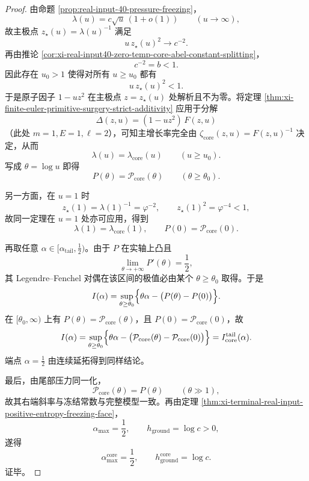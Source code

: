 \begin{proof}
由命题 \ref{prop:real-input-40-pressure-freezing}，
\[
\lambda(u)=c\sqrt u\,(1+o(1))
\qquad(u\to\infty),
\]
故主极点 \(z_\star(u)=\lambda(u)^{-1}\) 满足
\[
u\,z_\star(u)^2\longrightarrow c^{-2}.
\]
再由推论 \ref{cor:xi-real-input40-zero-temp-core-abel-constant-splitting}，
\[
c^{-2}=b<1.
\]
因此存在 \(u_0>1\) 使得对所有 \(u\ge u_0\) 都有
\[
u\,z_\star(u)^2<1.
\]
于是原子因子 \(1-uz^2\) 在主极点 \(z=z_\star(u)\) 处解析且不为零。将定理
\ref{thm:xi-finite-euler-primitive-surgery-strict-additivity} 应用于分解
\[
\Delta(z,u)=(1-uz^2)\,F(z,u)
\]
（此处 \(m=1,E=1,\ell=2\)），可知主增长率完全由 \(\zeta_{\mathrm{core}}(z,u)=F(z,u)^{-1}\) 决定，从而
\[
\lambda(u)=\lambda_{\mathrm{core}}(u)
\qquad(u\ge u_0).
\]
写成 \(\theta=\log u\) 即得
\[
P(\theta)=\mathcal P_{\mathrm{core}}(\theta)
\qquad(\theta\ge\theta_0).
\]

另一方面，在 \(u=1\) 时
\[
z_\star(1)=\lambda(1)^{-1}=\varphi^{-2},
\qquad
z_\star(1)^2=\varphi^{-4}<1,
\]
故同一定理在 \(u=1\) 处亦可应用，得到
\[
\lambda(1)=\lambda_{\mathrm{core}}(1),
\qquad
P(0)=\mathcal P_{\mathrm{core}}(0).
\]

再取任意 \(\alpha\in[\alpha_{\mathrm{tail}},\frac12)\)。由于 \(P\) 在实轴上凸且
\[
\lim_{\theta\to+\infty}P'(\theta)=\frac12,
\]
其 Legendre--Fenchel 对偶在该区间的极值必由某个 \(\theta\ge \theta_0\) 取得。于是
\[
I(\alpha)
=
\sup_{\theta\ge \theta_0}
\Bigl\{\theta\alpha-\bigl(P(\theta)-P(0)\bigr)\Bigr\}.
\]
在 \([\theta_0,\infty)\) 上有 \(P(\theta)=\mathcal P_{\mathrm{core}}(\theta)\)，且 \(P(0)=\mathcal P_{\mathrm{core}}(0)\)，故
\[
I(\alpha)
=
\sup_{\theta\ge \theta_0}
\Bigl\{\theta\alpha-\bigl(\mathcal P_{\mathrm{core}}(\theta)-\mathcal P_{\mathrm{core}}(0)\bigr)\Bigr\}
=
I_{\mathrm{core}}^{\mathrm{tail}}(\alpha).
\]
端点 \(\alpha=\frac12\) 由连续延拓得到同样结论。

最后，由尾部压力同一化，
\[
\mathcal P_{\mathrm{core}}(\theta)=P(\theta)
\qquad(\theta\gg 1),
\]
故其右端斜率与冻结常数与完整模型一致。再由定理
\ref{thm:xi-terminal-real-input-positive-entropy-freezing-face}，
\[
\alpha_{\max}=\frac12,
\qquad
h_{\mathrm{ground}}=\log c>0,
\]
遂得
\[
\alpha_{\max}^{\mathrm{core}}=\frac12,
\qquad
h_{\mathrm{ground}}^{\mathrm{core}}=\log c.
\]
证毕。
\end{proof}

